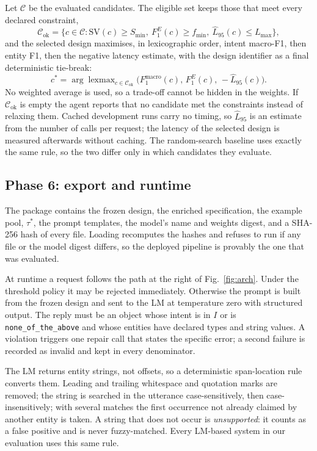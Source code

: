 \documentclass[conference]{IEEEtran}
\begin{document}
Let $\mathcal{C}$ be the evaluated candidates. The eligible set keeps those that meet every declared constraint,
\begin{equation}
\mathcal{C}_{\text{ok}}=\{c\in\mathcal{C}: \mathrm{SV}(c)\ge S_{\min},\ F_1^{E}(c)\ge f_{\min},\ \hat{L}_{95}(c)\le L_{\max}\},
\end{equation}
and the selected design maximises, in lexicographic order, intent macro-F1, then entity F1, then the negative latency estimate, with the design identifier as a final deterministic tie-break:
\begin{equation}
c^{*}=\arg\operatorname{lexmax}_{c\in\mathcal{C}_{\text{ok}}}\big(F_1^{\text{macro}}(c),\,F_1^{E}(c),\,-\hat{L}_{95}(c)\big).
\end{equation}
No weighted average is used, so a trade-off cannot be hidden in the weights. If $\mathcal{C}_{\text{ok}}$ is empty the agent reports that no candidate met the constraints instead of relaxing them. Cached development runs carry no timing, so $\hat{L}_{95}$ is an estimate from the number of calls per request; the latency of the selected design is measured afterwards without caching. The random-search baseline uses exactly the same rule, so the two differ only in which candidates they evaluate.

\subsection{Phase 6: export and runtime}

The package contains the frozen design, the enriched specification, the example pool, $\tau^{*}$, the prompt templates, the model's name and weights digest, and a SHA-256 hash of every file. Loading recomputes the hashes and refuses to run if any file or the model digest differs, so the deployed pipeline is provably the one that was evaluated.

At runtime a request follows the path at the right of Fig.~\ref{fig:arch}. Under the threshold policy it may be rejected immediately. Otherwise the prompt is built from the frozen design and sent to the LM at temperature zero with structured output. The reply must be an object whose intent is in $I$ or is \texttt{none\_of\_the\_above} and whose entities have declared types and string values. A violation triggers one repair call that states the specific error; a second failure is recorded as invalid and kept in every denominator.

The LM returns entity strings, not offsets, so a deterministic span-location rule converts them. Leading and trailing whitespace and quotation marks are removed; the string is searched in the utterance case-sensitively, then case-insensitively; with several matches the first occurrence not already claimed by another entity is taken. A string that does not occur is \emph{unsupported}: it counts as a false positive and is never fuzzy-matched. Every LM-based system in our evaluation uses this same rule.
\end{document}
